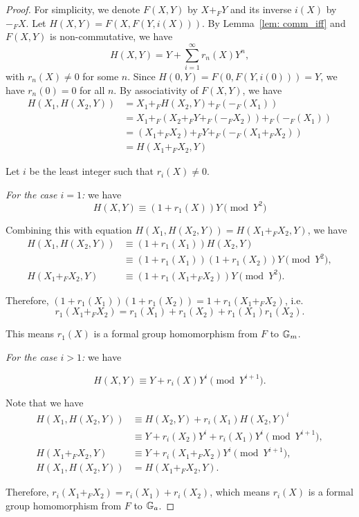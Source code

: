 \begin{proof}
    For simplicity, we denote $F(X,Y)$ by $X +_F Y$ and its inverse $i(X)$ by $-_F X$.
    Let $H(X,Y) = F(X, F(Y, i(X)))$.
    By Lemma~\ref{lem: comm_iff} and $F(X,Y)$ is non-commutative,
    we have
    \[H(X,Y) = Y + \sum _{i=1}^\infty r_n(X) Y ^ n,\]
    with $r_n(X) \neq 0$ for some $n$. Since $H(0,Y) = F(0, F(Y, i(0))) = Y$, we have $r_n(0) = 0$ for all $n$. By
    associativity of $F(X,Y)$, we have
    \[
    \begin{aligned}
        H(X_1,H(X_2,Y)) &= X_1 +_F H(X_2,Y) +_F (-_F (X_1)) \\
        & = X_1 +_F (X_2 +_F Y +_F (-_F X_2)) +_F (-_F (X_1)) \\
        & = (X_1 +_F X_2) +_F Y +_F (-_F (X_1 +_F X_2)) \\
        &= H(X_1+_F X_2, Y)
    \end{aligned}
    \]

    Let $i$ be the least integer such that $r_i(X) \neq 0$.

    \textit{For the case $i = 1$:} we have
    \begin{equation*}
        H(X,Y) \equiv (1+ r_1(X)) Y \pmod{Y ^ 2}
    \end{equation*}

    Combining this with equation $H(X_1,H(X_2,Y)) = H(X_1+_F X_2, Y)$, we have
    \[
    \begin{aligned}
        H(X_1, H(X_2,Y)) &\equiv (1 + r_1(X_1)) H(X_2,Y) \\
         &\equiv (1+ r_1(X_1)) (1 + r_1(X_2)) Y
        \pmod{Y ^ 2}, \\
        H(X_1+_F X_2, Y) &\equiv (1+ r_1(X_1+_F X_2)) Y \pmod{Y ^ 2}.
    \end{aligned}\]

    Therefore, $(1 + r_1(X_1)) (1+ r_1(X_2)) = 1 + r_1(X_1 + _F X_2)$, i.e.
    \[r_1(X_1+_F X_2) = r_1(X_1) + r_1(X_2) + r_1(X_1) r_1(X_2).\]

    This means $r_1(X)$ is a formal group homomorphism from $F$ to $\mathbb{G}_m$.

    \textit{For the case $i > 1$:} we have

    \[H(X,Y) \equiv Y + r_i(X) Y ^ i \pmod{Y ^ {i+ 1}}.\]

    Note that we have
    \[
    \begin{aligned}
    H(X_1, H(X_2,Y)) &\equiv H(X_2,Y) + r_i(X_1) H(X_2,Y)^i \\
        &\equiv Y + r_i(X_2)Y^i + r_i(X_1)Y^i \pmod{Y^{i+1}}, \\
    H(X_1 +_F X_2,Y) &\equiv Y + r_i(X_1 +_F X_2)Y^i \pmod{Y^{i+1}}, \\
    H(X_1,H(X_2,Y)) &= H(X_1 +_F X_2,Y).
    \end{aligned}
    \]

    Therefore, $r_i(X_1+_F X_2) = r_i(X_1) + r_i(X_2)$, which means $r_i(X)$ is a formal group
    homomorphism from $F$ to $\mathbb{G}_a$.
\end{proof}

